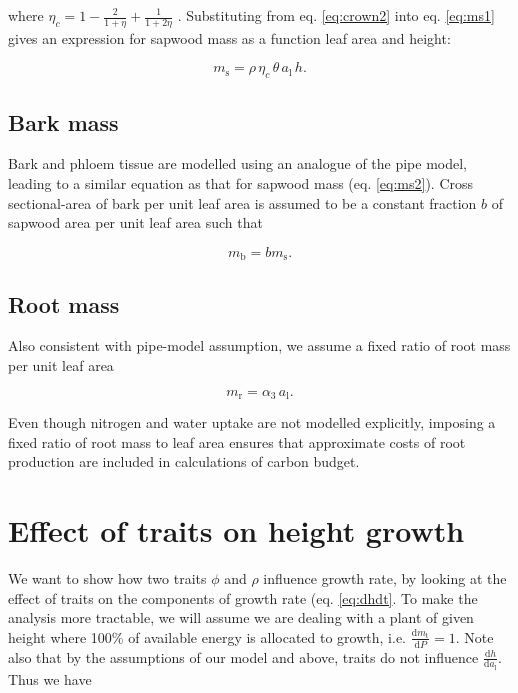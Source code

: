 \documentclass[12pt, a4paper]{article}
\begin{document}
\begin{appendices}
where
$\eta_c=1-\frac{2}{1+\eta} + \frac{1}{1+2\eta}$ \citep{yokozawa-1995}.
Substituting from eq. \ref{eq:crown2} into eq. \ref{eq:ms1} gives an
expression for sapwood mass as a function leaf area and height:

\begin{equation}\label{eq:ms2}
m_\textrm{s}=\rho \, \eta_c \, \theta \, a_\textrm{l} \, h.
\end{equation}

\subsection{Bark mass}\label{bark-mass}

Bark and phloem tissue are modelled using an analogue of the pipe model,
leading to a similar equation as that for sapwood mass (eq.
\ref{eq:ms2}). Cross sectional-area of bark per unit leaf area is
assumed to be a constant fraction $b$ of sapwood area per unit leaf
area such that

\begin{equation}\label{eq:mb}
m_\textrm{b}=b m_\textrm{s}.
\end{equation}

\subsection{Root mass}\label{root-mass}

Also consistent with pipe-model assumption, we assume a fixed ratio of
root mass per unit leaf area

\begin{equation}\label{eq:mr}
m_\textrm{r}=\alpha_3 \, a_\textrm{l}.
\end{equation}

Even though nitrogen and water uptake are not modelled explicitly,
imposing a fixed ratio of root mass to leaf area ensures that
approximate costs of root production are included in calculations of
carbon budget.

\section{Effect of traits on height growth} \label{app:traits_max}

We want to show how two traits $\phi$ and $\rho$ influence growth rate,
by looking at the effect of
traits on the components of growth rate (eq. \ref{eq:dhdt}. To make
the analysis more tractable, we will assume we are dealing with a plant of
given height where 100\% of available energy is allocated to growth,
i.e. $\frac{\textrm{d}m_\textrm{t}}{\textrm{d}P}=1$. Note also
that by the assumptions of our model and above, traits do not influence
$\frac{\textrm{d}h} {\textrm{d}a_\textrm{l}}$. Thus we have


\end{appendices}
\end{document}
